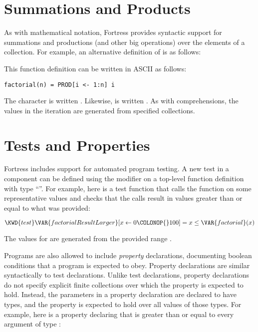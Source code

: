 \section{Summations and Products}
As with mathematical notation, Fortress provides syntactic support for
summations and productions (and other big operations) over the elements of a collection.
For example, an alternative definition of  is as follows:



This function definition can be written in ASCII as follows:

\begin{verbatim}
factorial(n) = PROD[i <- 1:n] i
\end{verbatim}

The character \EXP{\prod} is written .  Likewise,
\EXP{\sum} is written .
As with comprehensions, the values in the iteration are generated from specified collections.

\label{overviewTest}
\section{Tests and Properties}
Fortress includes support for automated program testing.
A new test in a component can be defined using the  modifier
on a top-level function definition with type ``\EXP{()\rightarrow()}''.
For example, here is a test function that calls the 
function on some representative values
and checks that the calls result in values greater than or equal to what was provided:


\begin{Fortress}
\(\KWD{test} \VAR{factorialResultLarger} [x \leftarrow 0\COLONOP{}100] = x \leq \VAR{factorial}(x)\)
\end{Fortress}

The values for  are generated from the provided range
.

Programs are also allowed to include \emph{property} declarations, documenting boolean conditions that a program is
expected to obey. Property declarations are similar syntactically to test declarations. Unlike test declarations,
property declarations do not specify explicit finite collections over which the property is expected to hold.
Instead, the parameters in a property declaration are declared to have types, and the property is expected to hold
over all values of those types. For example, here is a property declaring that  is greater than or equal
to every argument of type :

